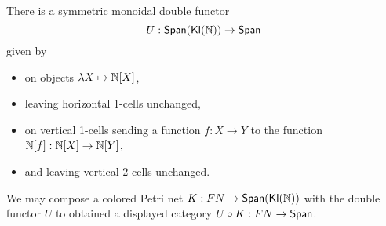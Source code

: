 \begin{prop}
    There is a symmetric monoidal double functor 
    \[ U : \mathsf{Span}(\mathsf{\mathsf{Kl}(\mathbb{N}) }) \to \mathsf{Span}\]
    given by 
    \begin{itemize}
        \item  on objects $ \lambda X \mapsto \mathbb{N}[X]$,
        \item leaving horizontal 1-cells unchanged,
        \item on vertical 1-cells sending a function $f: X \to Y$ to the function $\mathbb{N}[f] : \mathbb{N}[X] \to \mathbb{N}[Y]$,
        \item and leaving vertical 2-cells unchanged.
    \end{itemize}
\end{prop}
We may compose a colored Petri net $K : FN \to \mathsf{Span}(\mathsf{\mathsf{Kl}(\mathbb{N}) })$ with the double functor $U$ to obtained a displayed category $U \circ K : FN \to \mathsf{Span}$.




